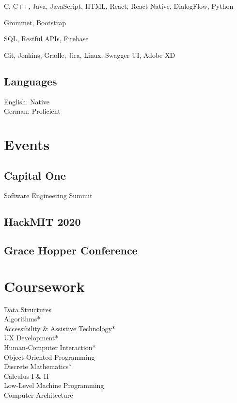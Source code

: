 \documentclass[]{hieudo-build}
\begin{document}
\begin{minipage}[t]{0.33\textwidth}
C, C++, Java, JavaScript, HTML, React, React Native, DialogFlow, Python\\ 
\smallsectionsep

Grommet, Bootstrap \\
\smallsectionsep

SQL, Restful APIs, Firebase \\
\smallsectionsep

Git, Jenkins, Gradle, Jira, Linux, Swagger UI, Adobe XD\\
\sectionsep

\subsection{Languages}
\smallsectionsep
English: Native \\
German: Proficient \\
\sectionsep

\section{Events}
\subsection{Capital One} 
Software Engineering Summit \\
\smallsectionsep
\subsection{HackMIT 2020}
\smallsectionsep
\subsection{Grace Hopper Conference}
\sectionsep


\section{Coursework}
Data Structures \\
Algorithms* \\
Accessibility \& Assistive Technology* \\
UX Development* \\
Human-Computer Interaction* \\
Object-Oriented Programming \\
Discrete Mathematics* \\
Calculus I \& II \\
Low-Level Machine Programming \\
Computer Architecture \\
\smallsectionsep
{}
\sectionsep


\end{minipage}
\end{document}
